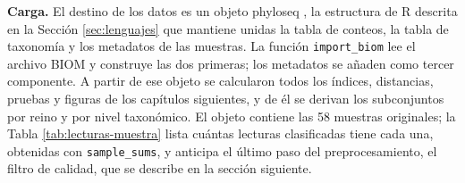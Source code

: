 \textbf{Carga.} El destino de los datos es un objeto phyloseq \citep{mcmurdie2013phyloseq}, la
estructura de R descrita en la Sección \ref{sec:lenguajes} que mantiene unidas la tabla de conteos,
la tabla de taxonomía y los metadatos de las muestras. La función \texttt{import\_biom} lee el
archivo BIOM y construye las dos primeras; los metadatos se añaden como tercer componente. A partir
de ese objeto se calcularon todos los índices, distancias, pruebas y figuras de los capítulos
siguientes, y de él se derivan los subconjuntos por reino y por nivel taxonómico. El objeto
contiene las 58 muestras originales; la Tabla \ref{tab:lecturas-muestra} lista cuántas lecturas
clasificadas tiene cada una, obtenidas con \texttt{sample\_sums}, y anticipa el último paso del
preprocesamiento, el filtro de calidad, que se describe en la sección siguiente.

